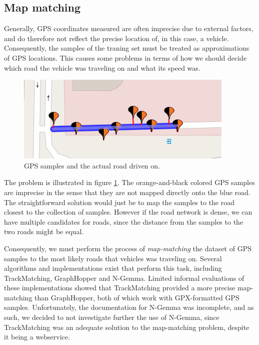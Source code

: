\subsection{Map matching}\label{sec:mapmatching}
Generally, GPS coordinates measured are often imprecise due to external factors, and do therefore not reflect the precise location of, in this case, a vehicle. Consequently, the samples of the traning set must be treated as approximations of GPS locations. This causes some problems in terms of how we should decide which road the vehicle was traveling on and what its speed was.

\begin{figure}
\includegraphics[scale=1]{figures/mapmatching.png}
\caption{GPS samples and the actual road driven on.}
\label{fig:mapmatching}
\end{figure}

The problem is illustrated in figure \ref{fig:mapmatching}. The orange-and-black colored GPS samples are imprecise in the sense that they are not mapped directly onto the blue road. The straightforward solution would just be to map the samples to the road closest to the collection of samples. However if the road network is dense, we can have multiple candidates for roads, since the distance from the samples to the two roads might be equal.

Consequently, we must perform the process of \emph{map-matching} the dataset of GPS samples to the most likely roads that vehicles was traveling on. Several algorithms and implementations exist that perform this task, including TrackMatching, GraphHopper and N-Gemma.  Limited informal evaluations of these implementations showed that TrackMatching provided a more precise map-matching than GraphHopper, both of which work with GPX-formatted GPS samples. Unfortunately, the documentation for N-Gemma was incomplete, and as such, we decided to not investigate further the use of N-Gemma, since TrackMatching was an adequate solution to the map-matching problem, despite it being a webservice.

